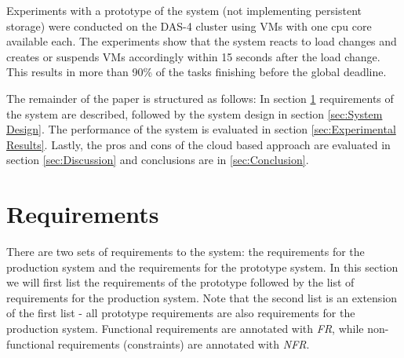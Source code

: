 \documentclass[10pt,journal,compsoc]{IEEEtran}
\begin{document}
Experiments with a prototype of the system (not implementing persistent storage) were conducted on the DAS-4 cluster using VMs with one cpu core
available each. The experiments show that the system reacts to load changes and
creates or suspends VMs accordingly within 15 seconds after the load change.
This results in more than 90\% of the tasks finishing before the global
deadline.


The remainder of the paper is structured as follows:
In section \ref{sec:requirements} 
requirements of the system are described, followed by the system design
in section \ref{sec:System Design}. The performance of the system is
evaluated in section \ref{sec:Experimental
Results}. Lastly, the pros and cons of the cloud based approach are evaluated in section
\ref{sec:Discussion} and conclusions are in \ref{sec:Conclusion}.




\section{Requirements}
\label{sec:requirements}
There are two sets of requirements to the system: the requirements for the production system and
the requirements for the prototype system. In this section we will first list
the requirements of the prototype followed by the list of requirements
for the production system. Note that the second list is an extension of the first
list - all prototype requirements are also requirements for the production system.
Functional requirements are annotated with \emph{FR}, while non-functional
requirements (constraints) are annotated with \emph{NFR}.\\
\end{document}
